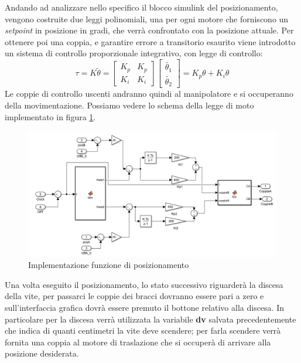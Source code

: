 Andando ad analizzare nello specifico il blocco simulink del posizionamento, vengono costruite due leggi polinomiali, una per ogni motore che forniscono un \textit{setpoint} in posizione in gradi, che verrà confrontato con la posizione attuale. Per ottenere poi una coppia, e garantire errore a transitorio esaurito viene introdotto un sistema di controllo proporzionale integrativo, con legge di controllo: 
\begin{equation*}
\tau = K \tilde{\theta} = \begin{bmatrix}
K_p & K_p \\ K_i & K_i
\end{bmatrix}
\begin{bmatrix}
\tilde{\theta_1} \\ \tilde{\theta_2}
\end{bmatrix} = K_p\theta + K_i\theta
\end{equation*}
Le coppie di controllo uscenti andranno quindi al manipolatore e si occuperanno della movimentazione. Possiamo vedere lo schema della legge di moto implementato in figura \ref{fig:ImpPos}.
\begin{figure}[ht]
	\begin{center}
		\includegraphics[scale=0.6]{Immagini/Sperimentale/LdmPosizionamento}
		\caption{Implementazione funzione di posizionamento}
		\label{fig:ImpPos}
	\end{center}
\end{figure}
\par Una volta eseguito il posizionamento, lo stato successivo riguarderà la discesa della vite, per passarci le coppie dei bracci dovranno essere pari a zero e sull'interfaccia grafica dovrà essere premuto il bottone relativo alla discesa. In particolare per la discesa verrà utilizzata la variabile \textbf{dv} salvata precedentemente che indica di quanti centimetri la vite deve scendere; per farla scendere verrà fornita una coppia al motore di traslazione che si occuperà di arrivare alla posizione desiderata.
